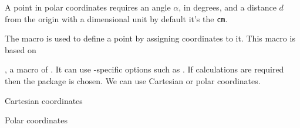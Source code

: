  A point in polar coordinates requires an angle $\alpha$, in degrees,
 and a distance  $d$ from the origin with a dimensional
 unit by default it's the \texttt{cm}.
 
 The  macro is used to define a point by assigning coordinates to it. This macro is based on 
 
 , a macro of \TIKZ. It can use \TIKZ-specific options such as . If calculations are required then the  package is chosen. We can use Cartesian or polar coordinates.
 
\begin{minipage}[t]{0.48\textwidth}
 Cartesian coordinates 
\begin{tkzexample}
\end{tkzexample}%
\end{minipage}
\begin{minipage}[t]{0.45\textwidth}
 Polar coordinates
\begin{tkzexample}
\end{tkzexample}
\end{minipage}%


